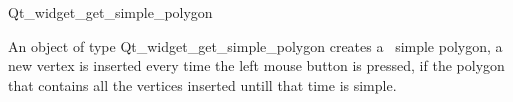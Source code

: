 
\begin{ccRefClass}{Qt_widget_get_simple_polygon}

\ccDefinition
An object of type Qt\_widget\_get\_simple\_polygon creates a \cgal\ simple polygon,
 a new vertex is inserted every time the left mouse button is pressed, if the 
polygon that contains all the vertices inserted untill that time is simple.


\ccGlue

\ccCreation
{}


\end{ccRefClass}








